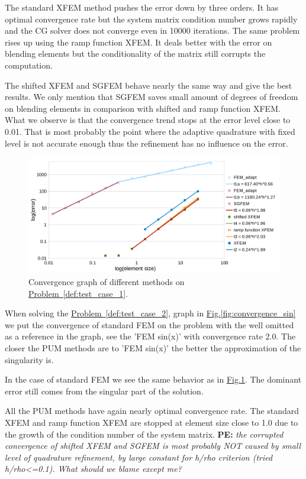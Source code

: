 \documentclass[preprint,12pt]{elsarticle}
\newcommand{\probref}[1]{\hyperref[#1]{Problem~\ref{#1}}}
\newcommand{\fig}[1]{\hyperref[#1]{Fig.\ref{#1}}}
\newcommand{\notePE}[1]{{\color{Orange} \textbf{PE: } \textit{#1}}}
\begin{document}
The standard XFEM method pushes the error down by three orders. It has optimal convergence rate but the system
matrix condition number grows rapidly and the CG solver does not converge even in 10000 iterations. The same
problem rises up using the ramp function XFEM. It deals better with the error on blending elements but the
conditionality of the matrix still corrupts the computation.

The shifted XFEM and SGFEM behave nearly the same way and give the best results. We only mention that SGFEM saves 
small amount of degrees of freedom on blending elements in comparison with shifted and ramp function XFEM.
What we observe is that the convergence trend stops at the error level close to 0.01. That is most probably
the point where the adaptive quadrature with fixed level is not accurate enough thus the 
refinement has no influence on the error.

\begin{figure}[!htb]
  \centering    
  \includegraphics[width=\textwidth]{results/convergence.pdf}
  \caption[Convergence graph \probref{def:test_case_1}]{Convergence graph of different methods on 
  \probref{def:test_case_1}. }
  \label{fig:convergence}
\end{figure}

When solving the \probref{def:test_case_2}, graph in \fig{fig:convergence_sin} we put the convergence of 
standard FEM on the problem with the well omitted as a reference in the graph, see the 'FEM sin(x)' with 
convergence rate 2.0. The closer the PUM methods are to 'FEM sin(x)' the better the approximation of 
the singularity is.

In the case of standard FEM we see the same behavior as in \fig{fig:convergence}. The dominant error still 
comes from the singular part of the solution. 

All the PUM methods have again nearly optimal convergence rate. The standard XFEM and ramp function XFEM
are stopped at element size close to 1.0 due to the growth of the condition number of the system matrix.
\notePE{the corrupted convergence of shifted XFEM and SGFEM  is most probably NOT caused
by small level of quadrature refinement, by large constant for h/rho criterion (tried h/rho<=0.1). What should 
we blame except me?}
\end{document}

